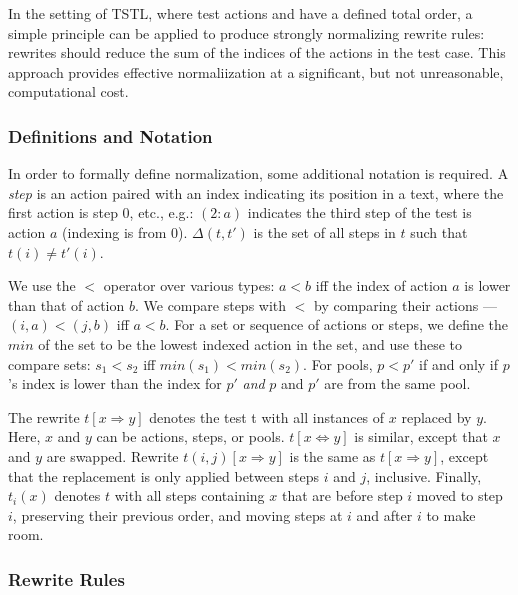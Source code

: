 In the setting of TSTL, where test actions and have a defined total
order, a simple principle can be applied to produce strongly
normalizing rewrite rules: rewrites should reduce the sum of the
indices of the actions in the test case.  This approach
provides effective normaliization at a significant, but not
unreasonable, computational cost.

\subsubsection{Definitions and Notation}

In order to formally define normalization, some additional notation is required.
A \emph{step} is an action paired with an index indicating its position in a text,
where the first action is step 0, etc., e.g.: $(2: a)$ indicates the
third step of the test is action $a$ (indexing is from 0). 
$\Delta(t,t')$ is the set of all steps in $t$ such that $t(i) \not= t'(i)$.

We use the $<$ operator over various types:
$a < b$ iff the index of action $a$ is lower
than that of action $b$.  We compare steps with $<$ by comparing their
actions --- $(i,a) < (j,b)$ iff $a < b$.  For a set or sequence of actions or steps, we define the $min$ of the
set to be the lowest indexed action in the set, and use
these to compare sets:  $s_1 < s_2$ iff $min(s_1) < min(s_2)$. For pools,
$p < p'$ if and only if $p$'s index is lower than the index for $p'$
\emph{and} $p$ and $p'$ are from the same pool.

The rewrite $t[x \Rightarrow y]$ denotes the test t with all instances of $x$
replaced by $y$.  Here, $x$ and $y$ can be actions, steps, or pools.
$t[x \Leftrightarrow y]$ is similar, except that $x$ and $y$ are
swapped.  Rewrite $t(i,j)[x \Rightarrow y]$ is the same as $t[x \Rightarrow
y]$, except that the replacement is only applied between steps $i$ and
$j$, inclusive.  Finally, $t_i(x)$ denotes $t$ with all steps
containing $x$ that are before step $i$ moved to step $i$, preserving
their previous order, and moving steps at $i$ and after $i$ to make room.

\subsubsection{Rewrite Rules}

